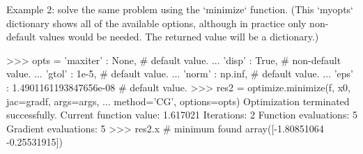 \begin{DoxyVerb}
Example 2: solve the same problem using the `minimize` function.
(This `myopts` dictionary shows all of the available options,
although in practice only non-default values would be needed.
The returned value will be a dictionary.)

>>> opts = {'maxiter' : None,    # default value.
...         'disp' : True,    # non-default value.
...         'gtol' : 1e-5,    # default value.
...         'norm' : np.inf,  # default value.
...         'eps' : 1.4901161193847656e-08}  # default value.
>>> res2 = optimize.minimize(f, x0, jac=gradf, args=args,
...                          method='CG', options=opts)
Optimization terminated successfully.
        Current function value: 1.617021
        Iterations: 2
        Function evaluations: 5
        Gradient evaluations: 5
>>> res2.x  # minimum found
array([-1.80851064 -0.25531915])\end{DoxyVerb}
 \hypertarget{namespacescipy_1_1optimize_1_1optimize_a3c84b9f84989d42e4f290b2f239cfb4e}{}
